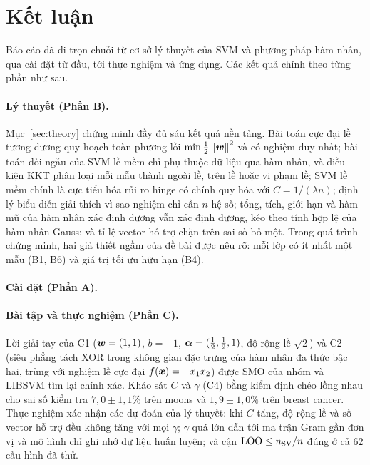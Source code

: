\section{Kết luận}\label{sec:conclusion}

Báo cáo đã đi trọn chuỗi từ cơ sở lý thuyết của SVM và phương pháp hàm nhân, qua cài đặt từ đầu,
tới thực nghiệm và ứng dụng. Các kết quả chính theo từng phần như sau.

\paragraph{Lý thuyết (Phần B).} Mục~\ref{sec:theory} chứng minh đầy đủ sáu kết quả nền tảng. Bài toán
cực đại lề tương đương quy hoạch toàn phương lồi $\min \frac12\left\lVert \bm{w} \right\rVert^2$ và có nghiệm duy nhất; bài
toán đối ngẫu của SVM lề mềm chỉ phụ thuộc dữ liệu qua hàm nhân, và điều kiện KKT phân loại mỗi mẫu
thành ngoài lề, trên lề hoặc vi phạm lề; SVM lề mềm chính là cực tiểu hóa rủi ro hinge có chính quy
hóa với $C = 1/(\lambda n)$; định lý biểu diễn giải thích vì sao nghiệm chỉ cần $n$ hệ số; tổng, tích,
giới hạn và hàm mũ của hàm nhân xác định dương vẫn xác định dương, kéo theo tính hợp lệ của hàm nhân
Gauss; và tỉ lệ vector hỗ trợ chặn trên sai số bỏ-một. Trong quá trình chứng minh, hai giả thiết ngầm
của đề bài được nêu rõ: mỗi lớp có ít nhất một mẫu (B1, B6) và giá trị tối ưu hữu hạn (B4).

\paragraph{Cài đặt (Phần A).} 

\paragraph{Bài tập và thực nghiệm (Phần C).} Lời giải tay của C1 ($\bm{w} = (1, 1)$, $b = -1$,
$\bm{\alpha} = (\frac12, \frac12, 1)$, độ rộng lề $\sqrt2$) và C2 (siêu phẳng tách XOR trong không gian
đặc trưng của hàm nhân đa thức bậc hai, trùng với nghiệm lề cực đại $f(\bm{x}) = -x_1x_2$) được SMO của
nhóm và LIBSVM tìm lại chính xác. Khảo sát $C$ và $\gamma$ (C4) bằng kiểm định chéo lồng nhau cho sai
số kiểm tra $7{,}0 \pm 1{,}1\%$ trên moons và $1{,}9 \pm 1{,}0\%$ trên breast cancer. Thực nghiệm xác
nhận các dự đoán của lý thuyết: khi $C$ tăng, độ rộng lề và số vector hỗ trợ đều không tăng với mọi
$\gamma$; $\gamma$ quá lớn dẫn tới ma trận Gram gần đơn vị và mô hình chỉ ghi nhớ dữ liệu huấn luyện;
và cận $\text{LOO} \le n_{\mathrm{SV}}/n$ đúng ở cả $62$ cấu hình đã thử. 


